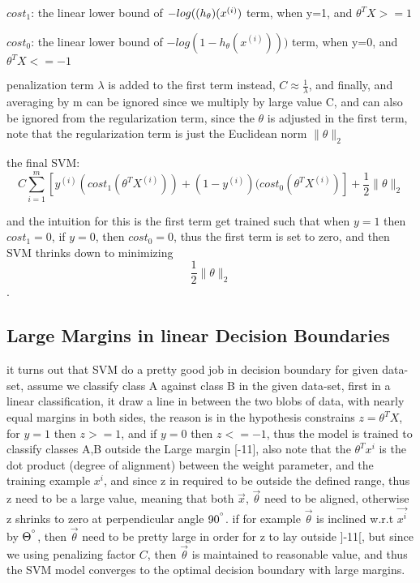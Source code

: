 \documentclass[4apaper,12pt]{book}
\begin{document}
\begin{description}
  \item $cost_1$: the linear lower bound of $-log(\text( h_{\theta})(x^{(i)})$ term, when y=1, and $\theta^TX>=1$
  \item $cost_0$: the linear lower bound of $-log(1-h_{\theta}(x^{(i)})))$ term, when y=0, and $\theta^TX<=-1$
  \item penalization term $\lambda$ is added to the first term instead,  $C \approx \frac{1}{\lambda}$, and finally, and averaging by m can be ignored since we multiply by large value C, and can also be ignored from the regularization term, since the $\theta$ is adjusted in the first term, note that the regularization term is just the Euclidean norm $\lVert \theta \rVert_2$
  \item the final SVM: $$C\sum_{i=1}^m[y^{(i)}(cost_1(\theta^TX^{(i)})) + (1-y^{(i)}) (cost_0(\theta^TX^{(i)})] + \frac{1}{2} \lVert \theta \rVert_2$$
  \item and the intuition for this is the first term get trained such that when $y=1$ then $cost_1=0$, if $y=0$, then $cost_0=0$, thus the first term is set to zero, and then SVM thrinks down to minimizing $$\frac{1}{2} \lVert \theta \rVert_2$$.
    \subsection{Large Margins in linear Decision Boundaries}
    \begin{description}
    \item it turns out that SVM do a pretty good job in decision boundary for given data-set, assume we classify class A against class B in the given data-set, first in a linear classification, it draw a line in between the two blobs of data, with nearly equal margins in both sides, the reason is in the hypothesis constrains $z=\theta^TX$, for $y=1$ then $z>=1$, and if $y=0$ then $z<=-1$, thus the model is trained to classify classes A,B outside the Large margin [-1\text{-}1], also note that the $\theta^Tx^i$ is the dot product (degree of alignment) between the weight parameter, and the training example $x^i$, and since z in required to be outside the defined range, thus z need to be a large value, meaning that both $\vec{x}$, $\vec{\theta}$ need to be aligned, otherwise z shrinks to zero at perpendicular angle $90^{\degree}$. if for example $\vec{\theta}$ is inclined w.r.t $\vec{x^{i}}$ by $\Theta^{\degree}$, then $\vec{\theta}$ need to be pretty large in order for z to lay outside ]-1\text{-}1[, but since we using penalizing factor $C$, then $\vec{\theta}$ is maintained to reasonable value, and thus the SVM model converges to the optimal decision boundary with large margins.
    \end{description}

\end{description}
\end{document}
